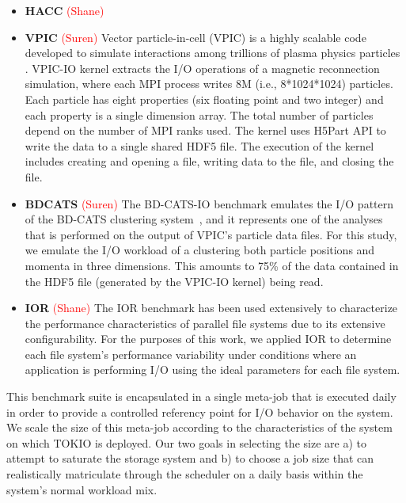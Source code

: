 \documentclass[conference,10pt,compsocconf]{IEEEtran}
\newcommand{\assign}[1]{\textcolor{red}{(#1)}}
\begin{document}
\begin{itemize}
\item \textbf{HACC} \assign{Shane}
\item \textbf{VPIC} \assign{Suren} 
Vector particle-in-cell (VPIC) is a highly scalable code developed to simulate
interactions among trillions of plasma physics particles  \cite{Bowers2008}.
VPIC-IO kernel extracts the I/O operations of a magnetic reconnection
simulation, where each MPI process writes 8M (i.e., 8*1024*1024) particles. Each
particle has eight properties (six floating point and two integer) and each
property is a single dimension array. The total number of particles depend on
the number of MPI ranks used. The kernel uses H5Part API \cite{H5Part} to write
the data to a single shared HDF5 file. The execution of the kernel includes
creating and opening a file, writing data to the file, and closing the file.

\item \textbf{BDCATS} \assign{Suren} The BD-CATS-IO benchmark emulates the I/O
pattern of the BD-CATS clustering system~\cite{Patwary2015}, and it represents
one of the analyses that is performed on the output of VPIC's particle data files.
For this study, we emulate the I/O workload of a clustering both particle
positions and momenta in three dimensions.  This amounts to 75\% of the data
contained in the HDF5 file (generated by the VPIC-IO kernel) being read.

\item \textbf{IOR} \assign{Shane} The IOR benchmark has been used extensively
to characterize the performance characteristics of parallel file systems\cite{Yildiz2016,Xie2012,Lofstead2010,Uselton2010}
due to its extensive configurability.  For the purposes of this work, we applied
IOR to determine each file system's performance variability under conditions
where an application is performing I/O using the ideal parameters for each
file system.

\end{itemize}

This benchmark suite is encapsulated in a single meta-job that is executed
daily in order to provide a controlled referency point for I/O behavior on
the system.  We scale the size of this meta-job according to the
characteristics of the system on which TOKIO is deployed.  Our two goals in
selecting the size are a) to attempt to saturate the storage system and b) to
choose a job size that can realistically matriculate through the scheduler on
a daily basis within the system's normal workload mix.
\end{document}

